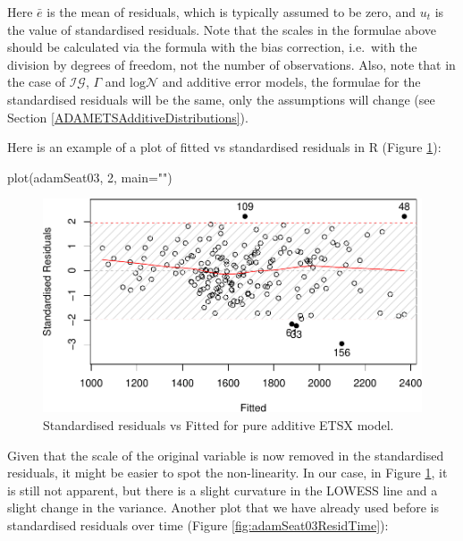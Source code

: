 \documentclass[
]{book}
\newenvironment{Shaded}{\begin{snugshade}}{\end{snugshade}}
\newcommand{\AttributeTok}[1]{\textcolor[rgb]{0.77,0.63,0.00}{#1}}
\newcommand{\DecValTok}[1]{\textcolor[rgb]{0.00,0.00,0.81}{#1}}
\newcommand{\FunctionTok}[1]{\textcolor[rgb]{0.00,0.00,0.00}{#1}}
\newcommand{\NormalTok}[1]{#1}
\newcommand{\StringTok}[1]{\textcolor[rgb]{0.31,0.60,0.02}{#1}}
\theoremstyle{definition}
\theoremstyle{definition}
\theoremstyle{definition}
\theoremstyle{definition}
\theoremstyle{remark}
\begin{document}
Here \(\bar{e}\) is the mean of residuals, which is typically assumed to be zero, and \(u_t\) is the value of standardised residuals. Note that the scales in the formulae above should be calculated via the formula with the bias correction, i.e.~with the division by degrees of freedom, not the number of observations. Also, note that in the case of \(\mathcal{IG}\), \(\Gamma\) and \(\mathrm{log}\mathcal{N}\) and additive error models, the formulae for the standardised residuals will be the same, only the assumptions will change (see Section \ref{ADAMETSAdditiveDistributions}).

Here is an example of a plot of fitted vs standardised residuals in R (Figure \ref{fig:adamSeat03Resid}):

\begin{Shaded}
\begin{Highlighting}[]
\FunctionTok{plot}\NormalTok{(adamSeat03, }\DecValTok{2}\NormalTok{, }\AttributeTok{main=}\StringTok{""}\NormalTok{)}
\end{Highlighting}
\end{Shaded}

\begin{figure}
\centering
\includegraphics{Svetunkov--2022----ADAM_files/figure-latex/adamSeat03Resid-1.pdf}
\caption{\label{fig:adamSeat03Resid}Standardised residuals vs Fitted for pure additive ETSX model.}
\end{figure}

Given that the scale of the original variable is now removed in the standardised residuals, it might be easier to spot the non-linearity. In our case, in Figure \ref{fig:adamSeat03Resid}, it is still not apparent, but there is a slight curvature in the LOWESS line and a slight change in the variance. Another plot that we have already used before is standardised residuals over time (Figure \ref{fig:adamSeat03ResidTime}):
\end{document}
